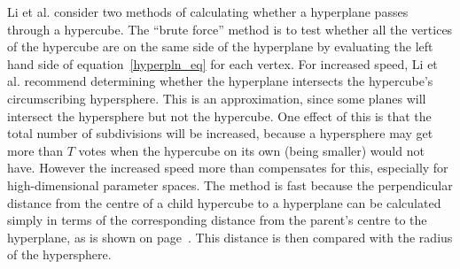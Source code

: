  Li et al. consider two methods of calculating whether a hyperplane passes
 through a hypercube. The ``brute force'' method is to test whether all
 the vertices of the hypercube are on the same side of the hyperplane by
 evaluating the left hand side of equation~\ref{hyperpln_eq} for each
 vertex. For increased speed, Li et al. recommend determining whether the
 hyperplane intersects the hypercube's circumscribing hypersphere.
 This is an approximation, since some planes will intersect the
 hypersphere but not the hypercube. One effect of this is that the
 total number of subdivisions will be increased, because a hypersphere
 may get more than $T$ votes when the hypercube on its own
 (being smaller) would not have. However the increased speed more
 than compensates for this, especially for high-dimensional
 parameter spaces. The method is fast because the perpendicular distance
 from the centre of a child hypercube to a hyperplane can be
 calculated simply in terms of the corresponding distance from the parent's
 centre to the hyperplane, as is shown on page~\pageref{lookup_table}.
 This distance is then compared with the radius of the hypersphere.

